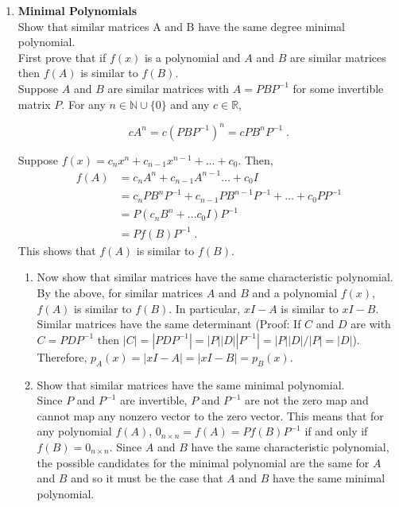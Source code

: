 \documentclass[a4paper]{article}
\begin{document}
\begin{enumerate}
\newpage
\item{\textbf{Minimal Polynomials}} \\
Show that similar matrices A and B have the same degree minimal polynomial. \\

First prove that if $f(x)$ is a polynomial and $A$ and $B$ are similar matrices then $f(A)$ is similar to $f(B)$. \\

Suppose $A$ and $B$ are similar matrices with $A = PBP^{-1}$ for some invertible matrix $P$. For any $n \in \mathbb{N}\cup \{0\}$ and any $c \in \mathbb{R}$, 

$$
cA^n = c(PBP^{-1})^n = cPB^nP^{-1} \;.
$$

Suppose $f(x) = c_nx^n + c_{n-1}x^{n-1} + \dots + c_0$. Then,
\begin{align*}
f(A) &= c_nA^n + c_{n-1}A^{n-1} \dots + c_0I\\
&= c_nPB^nP^{-1} + c_{n-1}PB^{n-1}P^{-1} + \dots + c_0PP^{-1} \\
&= P(c_nB^n + \dots c_0I)P^{-1} \\
& = Pf(B)P^{-1} \;.
\end{align*}
This shows that $f(A)$ is similar to $f(B)$. 

\begin{enumerate}
	\item Now show that similar matrices have the same
	characteristic polynomial. \\
	
	By the above, for similar matrices $A$ and $B$ and a 
	polynomial $f(x)$, $f(A)$ is similar to $f(B)$. In 
	particular, $xI-A$ is similar to $xI-B$. Similar matrices
	have the same determinant (Proof: If $C$ and $D$ are with
	$C = PDP^{-1}$ then $|C| = |PDP^{-1}| = |P||D||P^{-1}| =
	|P||D|/|P| = |D|$). Therefore, $p_A(x) = |xI-A| = |xI-B| =
	p_B(x)$. \\
	
	\item Show that similar matrices have the same minimal
	polynomial. \\
	
	Since $P$ and $P^{-1}$ are invertible, $P$ and $P^{-1}$ are
	not the zero map and cannot map any nonzero vector to the 
	zero vector. This means that for any polynomial $f(A)$,
	$0_{n\times n} = f(A) = Pf(B)P^{-1}$ if and only if $f(B) = 
	0_{n\times n}$. Since $A$ and $B$ have the same
	characteristic polynomial, the possible candidates for the
	minimal polynomial are the same for $A$ and $B$ and so it 
	must be the case that $A$ and $B$ have the same minimal
	polynomial.
	

\end{enumerate}
\end{enumerate}
\end{document}
